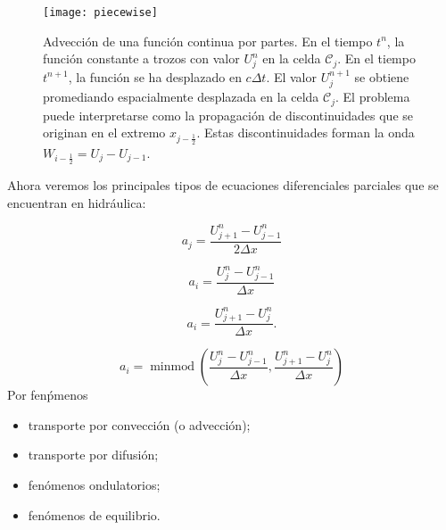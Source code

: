 \begin{frame}
	\begin{figure}[ht!]
		\centering
		\texttt{[image: piecewise]}
		\caption{Advección de una función continua por partes.
		En el tiempo $t^{n}$, la función constante a trozos con valor $U^{n}_{j}$ en la celda $\mathcal{C}_{j}$.
		En el tiempo $t^{n+1}$, la función se ha desplazado en $c\Delta t$.
		El valor $U^{n+1}_{j}$ se obtiene promediando espacialmente desplazada en la celda $\mathcal{C}_{j}$.
		El problema puede interpretarse como la propagación de discontinuidades que se originan en el extremo
		$x_{j-\frac{1}{2}}$.
		Estas discontinuidades forman la onda $W_{i-\frac{1}{2}}=U_{j}-U_{j-1}$.}
		\label{fig:piecewise}
	\end{figure}

	Ahora veremos los principales tipos de ecuaciones diferenciales
	parciales que se encuentran en hidráulica:

	\begin{equation*}
		a_{j}=
		\dfrac{U^{n}_{j+1}-U^{n}_{j-1}}{2\Delta x}
	\end{equation*}

	\begin{equation*}
		a_{i}=
		\dfrac{U^{n}_{j}-U^{n}_{j-1}}{\Delta x}
	\end{equation*}

	\begin{equation*}
		a_{i}=
		\dfrac{U^{n}_{j+1}-U^{n}_{j}}{\Delta x}.
	\end{equation*}

	\begin{equation*}
		a_{i}=
		\operatorname{minmod}
		\left(
		\dfrac{U^{n}_{j}-U^{n}_{j-1}}{\Delta x},
		\dfrac{U^{n}_{j+1}-U^{n}_{j}}{\Delta x}
		\right)
	\end{equation*}
	Por fenṕmenos
	\begin{itemize}
		\item

		      transporte por convección (o advección);

		\item

		      transporte por difusión;

		\item

		      fenómenos ondulatorios;

		\item

		      fenómenos de equilibrio.
	\end{itemize}
\end{frame}
